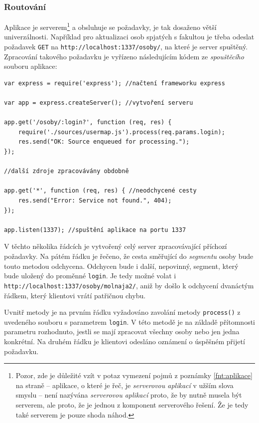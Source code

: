 \subsubsection{Routování}
Aplikace je serverem\footnote{Pozor, zde je důležité vzít v potaz vymezení pojmů z poznámky \ref{fnt:aplikace} na straně \pageref{fnt:aplikace} -- aplikace, o které je řeč, je \textit{serverovou aplikací} v užším slova smyslu -- není nazývána \textit{serverovou aplikací} proto, že by nutně musela být serverem, ale proto, že je jednou z komponent serverového řešení. Že je tedy také serverem je pouze shoda náhod.} a obsluhuje se  požadavky, je tak dosaženo větší univerzálnosti. Například pro aktualizaci osob spjatých s fakultou je třeba odeslat požadavek \texttt{GET} na  \texttt{http://\linebreak[0]localhost:1337/\linebreak[0]osoby/}, na které je server spuštěný. Zpracování takového požadavku je vyřízeno následujícím kódem ze \textit{spouštěcího} souboru aplikace:
\begin{verbatim}
var express = require('express'); //načtení frameworku express

var app = express.createServer(); //vytvoření serveru

app.get('/osoby/:login?', function (req, res) {
    require('./sources/usermap.js').process(req.params.login);
    res.send("OK: Source enqueued for processing.");
});

//další zdroje zpracovávány obdobně

app.get('*', function (req, res) { //neodchycené cesty
    res.send("Error: Service not found.", 404);
});

app.listen(1337); //spuštění aplikace na portu 1337
\end{verbatim}
V těchto několika řádcích je vytvořený celý server zpracovávající příchozí požadavky. Na pátém řádku je řečeno, že cesta směřující do \textit{segmentu} osoby bude touto metodou odchycena. Odchycen bude i další, nepovinný, segment, který bude uložený do proměnné \texttt{login}. Je tedy možné volat i  \texttt{http://\linebreak[0]localhost:1337/\linebreak[0]osoby/\linebreak[0]molnaja2/}, aniž by došlo k odchycení dvanáctým řádkem, který klientovi vrátí patřičnou chybu.

Uvnitř metody je na prvním řádku vyžadováno zavolání metody \texttt{process()} z uvedeného souboru s parametrem \texttt{login}. V této metodě je na základě přítomnosti parametru rozhodnuto, jestli se mají zpracovat všechny osoby nebo jen jedna konkrétní. Na druhém řádku je klientovi odesláno oznámení o úspěšném přijetí požadavku.

